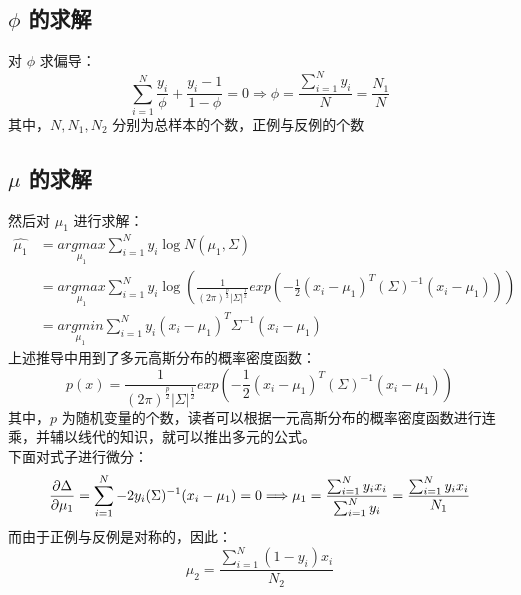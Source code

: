 \documentclass{report}
\begin{document}
\subsection{$\phi$ 的求解}
对 $\phi$ 求偏导：
$$
\sum_{i=1}^{N} \frac{y_{i}}{\phi}+\frac{y_{i}-1}{1-\phi}=0
\Longrightarrow \phi=\frac{\sum_{i=1}^{N} y_{i}}{N}=\frac{N_{1}}{N}
$$
其中，$N,N_1,N_2$ 分别为总样本的个数，正例与反例的个数
\subsection{$\mu$ 的求解}
然后对 $\mu_1$ 进行求解：
$$
\begin{aligned} \hat{\mu_{1}} 
&=\underset{\mu_{1}}{argmax} \sum_{i=1}^{N} y_{i} \log N\left(\mu_{1}, \Sigma\right) \\
&=\underset{\mu_1}{argmax} \sum_{i=1}^{N} y_i \log (\frac{1}{(2\pi)^{\frac{p}{2}}|\Sigma|^{\frac{1}{2}}}exp(-\frac{1}{2}(x_i-\mu_1)^T(\Sigma)^{-1}(x_i-\mu_1)))\\
&=\underset{\mu_{1}}{argmin} \sum_{i=1}^{N} y_{i}\left(x_{i}-\mu_{1}\right)^{T} \Sigma^{-1}\left(x_{i}-\mu_{1}\right)
\end{aligned}
$$
上述推导中用到了多元高斯分布的概率密度函数：
$$
p(x)=\frac{1}{(2\pi)^{\frac{p}{2}}|\Sigma|^{\frac{1}{2}}}exp(-\frac{1}{2}(x_i-\mu_1)^T(\Sigma)^{-1}(x_i-\mu_1))
$$
其中，$p$ 为随机变量的个数，读者可以根据一元高斯分布的概率密度函数进行连乘，并辅以线代的知识，就可以推出多元的公式。\\
下面对式子进行微分：
$$
\frac{\partial \Delta}{\partial \mu_1}=\sum_{i=1}^N -2y_i (\Sigma)^{-1}(x_i-\mu_1)=0\\
\Longrightarrow \mu_{1}=\frac{\sum_{i=1}^{N} y_{i} x_{i}}{\sum_{i=1}^{N} y_{i}}=\frac{\sum_{i=1}^{N} y_{i} x_{i}}{N_{1}}
$$
而由于正例与反例是对称的，因此：
$$
\mu_{2}=\frac{\sum_{i=1}^{N}\left(1-y_{i}\right) x_{i}}{N_{2}}
$$
\end{document}
